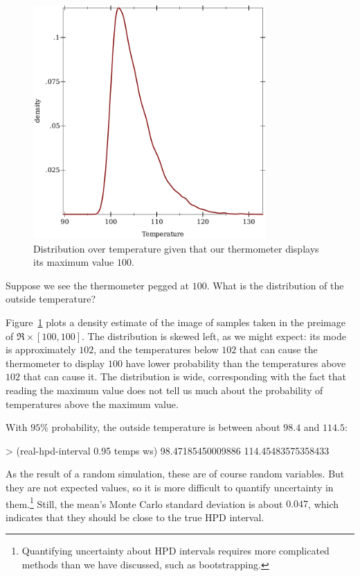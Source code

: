 \begin{figure}[tb!]\centering%
\includegraphics[width=3.5in]{results/thermometer-density}%
\caption[Bayesian inference with a bounded measuring device]{Distribution over temperature given that our thermometer displays its maximum value $100$.}%
\label{fig:thermometer-results}
\end{figure}

Suppose we see the thermometer pegged at $100$.
What is the distribution of the outside temperature?

Figure~\ref{fig:thermometer-results} plots a density estimate of the image of samples taken in the preimage of $\Re \times [100,100]$.
The distribution is skewed left, as we might expect: its mode is approximately $102$, and the temperatures below $102$ that can cause the thermometer to display $100$ have lower probability than the temperatures above $102$ that can cause it.
The distribution is wide, corresponding with the fact that reading the maximum value does not tell us much about the probability of temperatures above the maximum value.

With $95\%$ probability, the outside temperature is between about $98.4$ and $114.5$:
\begin{center}\singlespacing
\begin{schemedisplay}
> (real-hpd-interval 0.95 temps ws)
98.47185450009886
114.45483575358433
\end{schemedisplay}
\end{center}
As the result of a random simulation, these are of course random variables.
But they are not expected values, so it is more difficult to quantify uncertainty in them.\footnote{Quantifying uncertainty about HPD intervals requires more complicated methods than we have discussed, such as bootstrapping.}
Still, the mean's Monte Carlo standard deviation is about $0.047$, which indicates that they should be close to the true HPD interval.

